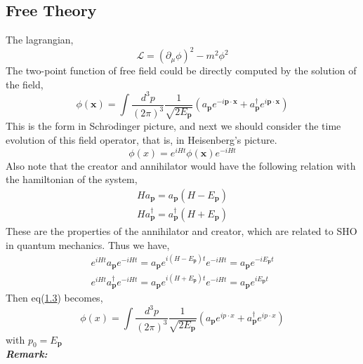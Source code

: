 \documentclass[12pt]{article}
\numberwithin{equation}{section}
\begin{document}
\subsection{Free Theory}
The lagrangian,
\begin{equation}
    \mathcal{L} = (\partial_{\mu}\phi)^2 - m^{2}\phi^2
\end{equation}
The two-point function of free field could be directly computed by the solution of the field,
\begin{equation}
    \phi(\mathbf{x}) = \int{\frac{d^3p}{(2\pi)^3}\frac{1}{\sqrt{2E_{\mathbf{p}}}}\left(a_{\mathbf{p}}e^{-i\mathbf{p}\cdot\mathbf{x}} + a^{\dagger}_{\mathbf{p}}e^{i\mathbf{p}\cdot\mathbf{x}}\right)}
\end{equation}\label{1.3}
This is the form in Schr$\ddot{\text{o}}$dinger picture, and next we should consider the time evolution of this field operator, that is, in Heisenberg's picture.
\begin{equation}
    \phi(x) = e^{iHt}\phi(\mathbf{x})e^{-iHt}
\end{equation}
Also note that the creator and annihilator would have the following relation with the hamiltonian of the system,
\begin{equation}
    \begin{split}
        Ha_{\mathbf{p}} = a_{\mathbf{p}}\left(H-E_{\mathbf{p}}\right)\\
        Ha_{\mathbf{p}}^{\dagger} = a_{\mathbf{p}}^{\dagger}\left(H+E_{\mathbf{p}}\right)
    \end{split}
\end{equation}
These are the properties of the annihilator and creator, which are related to SHO in quantum mechanics.
Thus we have,
\begin{equation}
    \begin{split}
        e^{iHt}a_{\mathbf{p}}e^{-iHt} = a_{\mathbf{p}}e^{i(H-E_{\mathbf{p}})t}e^{-iHt} = a_{\mathbf{p}}e^{-iE_{\mathbf{p}}t}\\
        e^{iHt}a^{\dagger}_{\mathbf{p}}e^{-iHt} = a_{\mathbf{p}}e^{i(H+E_{\mathbf{p}})t}e^{-iHt} = a_{\mathbf{p}}e^{iE_{\mathbf{p}}t}
    \end{split}
\end{equation}
Then eq(\hyperref[1.3]{1.3}) becomes,
\begin{equation}
    \phi(x) = \int{\frac{d^3p}{(2\pi)^3}\frac{1}{\sqrt{2E_{\mathbf{p}}}}\left(a_{\mathbf{p}}e^{ip\cdot x} + a^{\dagger}_{\mathbf{p}}e^{ip\cdot x}\right)}
\end{equation}
with $p_0 = E_{\mathbf{p}}$
\\\indent \textit{\textbf{Remark:}} 
\end{document}
